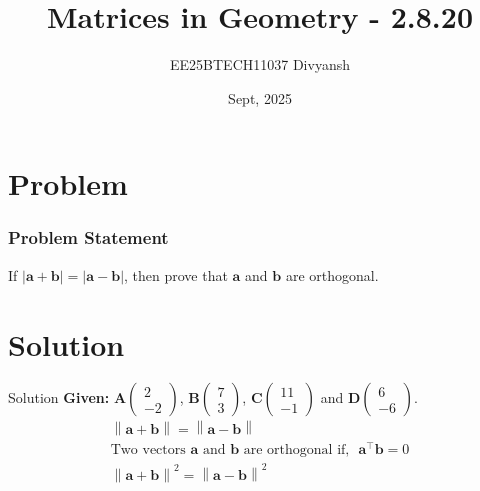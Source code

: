 \documentclass{beamer}
\title{Matrices in Geometry - 2.8.20}
\author{EE25BTECH11037  Divyansh}
\date{Sept, 2025}
\let\vec\mathbf
\theoremstyle{remark}
\providecommand{\norm}[1]{\left\lVert#1\right\rVert}
\providecommand{\abs}[1]{\left\vert#1\right\vert}
\newcommand{\myvec}[1]{\ensuremath{\begin{pmatrix}#1\end{pmatrix}}}
\begin{document}
\maketitle


\section{Problem}
\begin{frame}
\frametitle{Problem Statement}
If $\abs{\vec{a}+\vec{b}}=\abs{\vec{a}-\vec{b}}$, then prove that $\vec{a}$ and $\vec{b}$ are orthogonal.
\end{frame}

\section{Solution}
\begin{frame}{Solution}
   \textbf{Given: } 
 $\vec{A}\myvec{2\\-2}$, $\vec{B}\myvec{7\\3}$, $\vec{C}\myvec{11 \\ -1}$ and $\vec{D}\myvec{6 \\ -6}$.
\begin{align}
    \norm{\vec{a}+\vec{b}}=\norm{\vec{a}-\vec{b}}\\
    \text{Two vectors $\vec{a}$ and $\vec{b}$ are orthogonal if,} \ \ \ \vec{a}^{\top}\vec{b}=0\\
    \norm{\vec{a}+\vec{b}}^2=\norm{\vec{a}-\vec{b}}^2
\end{align}
\end{frame}
\end{document}
